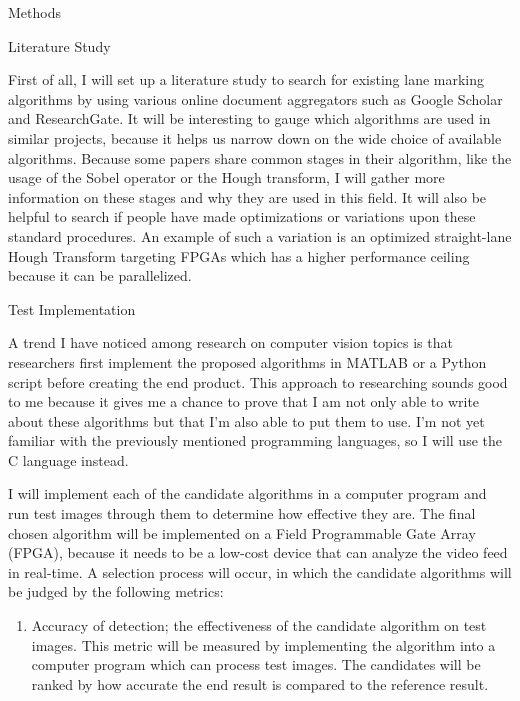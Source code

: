\documentclass{matthijs}
\begin{document}
	\begin{hoofdstuk}{Methods}

		\begin{paragraaf}{Literature Study}

			First of all, I will set up a literature study to search for existing lane marking algorithms by using various online document aggregators such as Google Scholar and ResearchGate.
			It will be interesting to gauge which algorithms are used in similar projects, because it helps us narrow down on the wide choice of available algorithms.
			Because some papers share common stages in their algorithm, like the usage of the Sobel operator or the Hough transform, I will gather more information on these stages and why they are used in this field.
			It will also be helpful to search if people have made optimizations or variations upon these standard procedures.
			An example of such a variation is an optimized straight-lane Hough Transform targeting FPGAs \cite{el2020novel} which has a higher performance ceiling because it can be parallelized.

		\end{paragraaf}

		\begin{paragraaf}{Test Implementation}

			A trend I have noticed among research on computer vision topics is that researchers first implement the proposed algorithms in MATLAB or a Python script before creating the end product.
			This approach to researching sounds good to me because it gives me a chance to prove that I am not only able to write about these algorithms but that I'm also able to put them to use.
			I'm not yet familiar with the previously mentioned programming languages, so I will use the C language instead.

			\bigskip

			I will implement each of the candidate algorithms in a computer program and run test images through them to determine how effective they are.
			The final chosen algorithm will be implemented on a Field Programmable Gate Array (FPGA), because it needs to be a low-cost device that can analyze the video feed in real-time.
			A selection process will occur, in which the candidate algorithms will be judged by the following metrics:

			\begin{enumerate}

				\item	Accuracy of detection; the effectiveness of the candidate algorithm on test images.
					This metric will be measured by implementing the algorithm into a computer program which can process test images.
					The candidates will be ranked by how accurate the end result is compared to the reference result.


\end{enumerate}
\end{paragraaf}
\end{hoofdstuk}
\end{document}
